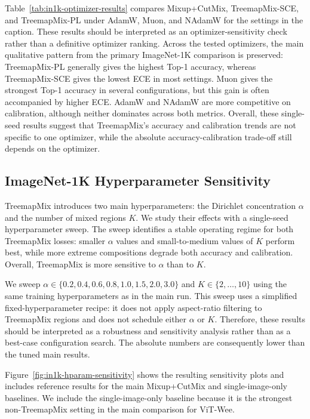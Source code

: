 Table~\ref{tab:in1k-optimizer-results} compares Mixup+CutMix,
TreemapMix-SCE, and TreemapMix-PL under AdamW, Muon, and NAdamW for
the settings in the caption. These results should be interpreted as an
optimizer-sensitivity check rather than a definitive optimizer ranking. Across
the tested optimizers, the main qualitative pattern from the primary
ImageNet-1K comparison is preserved: TreemapMix-PL generally gives the highest
Top-1 accuracy, whereas TreemapMix-SCE gives the lowest ECE in most settings.
Muon gives the strongest Top-1 accuracy in several configurations, but this
gain is often accompanied by higher ECE. AdamW and NAdamW are more competitive
on calibration, although neither dominates across both metrics. Overall, these
single-seed results suggest that TreemapMix's accuracy and calibration trends
are not specific to one optimizer, while the absolute accuracy-calibration
trade-off still depends on the optimizer.



\subsection{ImageNet-1K Hyperparameter Sensitivity}
\label{app:in1k-hparam-sensitivity}

TreemapMix introduces two main hyperparameters: the Dirichlet concentration
$\alpha$ and the number of mixed regions $K$. We study their effects with a
single-seed hyperparameter sweep. The sweep identifies a stable operating
regime for both TreemapMix losses: smaller $\alpha$ values and small-to-medium
values of $K$ perform best, while more extreme compositions degrade both
accuracy and calibration. Overall, TreemapMix is more sensitive to $\alpha$
than to $K$.

We sweep
$\alpha \in \{0.2, 0.4, 0.6, 0.8, 1.0, 1.5, 2.0, 3.0\}$ and
$K \in \{2,\ldots,10\}$ using the same training hyperparameters as in the
main run. This sweep uses a simplified fixed-hyperparameter recipe: it does
not apply aspect-ratio filtering to TreemapMix regions and does not schedule
either $\alpha$ or $K$. Therefore, these results should be interpreted as a
robustness and sensitivity analysis rather than as a best-case configuration
search. The absolute numbers are consequently lower than the tuned main
results.

Figure~\ref{fig:in1k-hparam-sensitivity} shows the resulting sensitivity plots
and includes reference results for the main Mixup+CutMix and single-image-only
baselines. We include the single-image-only baseline because it is the
strongest non-TreemapMix setting in the main comparison for ViT-Wee.

